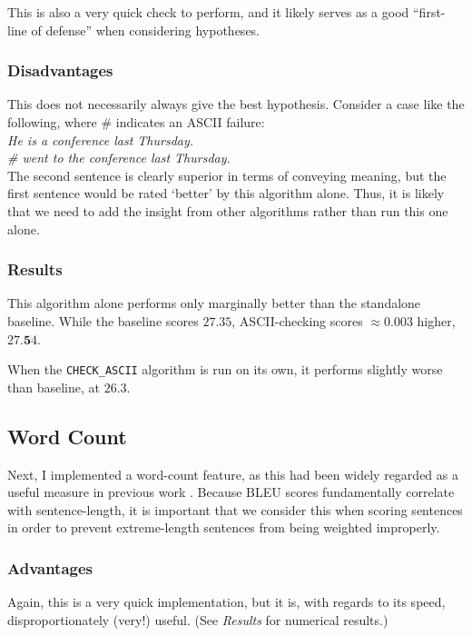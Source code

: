 \documentclass{article}
\begin{document}
This is also a very quick check to perform, and it likely serves as a good ``first-line of defense'' when considering hypotheses.

\subsubsection{Disadvantages}
This does not necessarily always give the best hypothesis. Consider a case like the following, where \# indicates an ASCII failure: \\

\textit{He is a conference last Thursday.} \\

\textit{\# went to the conference last Thursday.} \\

The second sentence is clearly superior in terms of conveying meaning, but the first sentence would be rated `better' by this algorithm alone. Thus, it is likely that we need to add the insight from other algorithms rather than run this one alone.

\subsubsection{Results}
This algorithm alone performs only marginally better than the standalone baseline. While the baseline scores $27.35$, ASCII-checking scores $\approx0.003$ higher, $27.\textbf{5}4$.

When the \texttt{CHECK\_ASCII} algorithm is run on its own, it performs slightly worse than baseline, at $26.3$.

\subsection{Word Count}
Next, I implemented a word-count feature, as this had been widely regarded as a useful measure in previous work \cite{upennstudent,hmm11}. Because BLEU scores fundamentally correlate with sentence-length, it is important that we consider this when scoring sentences in order to prevent extreme-length sentences from being weighted improperly.

\subsubsection{Advantages}
Again, this is a very quick implementation, but it is, with regards to its speed, disproportionately (very!) useful. (See \textit{Results} for numerical results.)
\end{document}

